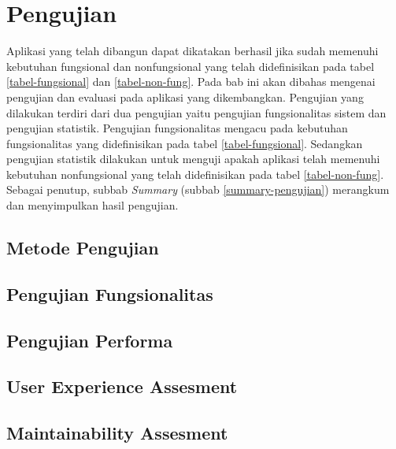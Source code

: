 \section{Pengujian}
	Aplikasi yang telah dibangun dapat dikatakan berhasil jika sudah memenuhi kebutuhan fungsional dan nonfungsional yang telah didefinisikan pada tabel \ref{tabel-fungsional} dan \ref{tabel-non-fung}. Pada bab ini akan dibahas mengenai pengujian dan evaluasi pada aplikasi yang dikembangkan. Pengujian yang dilakukan terdiri dari dua pengujian yaitu pengujian fungsionalitas sistem dan pengujian statistik. Pengujian fungsionalitas mengacu pada kebutuhan fungsionalitas yang didefinisikan pada tabel \ref{tabel-fungsional}. Sedangkan pengujian statistik dilakukan untuk menguji apakah aplikasi telah memenuhi kebutuhan nonfungsional yang telah didefinisikan pada tabel \ref{tabel-non-fung}. Sebagai penutup, subbab \textit{Summary} (subbab \ref{summary-pengujian}) merangkum dan menyimpulkan hasil pengujian.

	
	\subsection{Metode Pengujian}
	
		
	\subsection{Pengujian Fungsionalitas}
	\label{uji-fungsional}
	
	
	\subsection{Pengujian Performa}
	\label{uji-performa}
	
	
	\subsection{User Experience Assesment}
	\label{[uji-ux}
	
	
	\subsection{Maintainability Assesment}
	\label{uji-maintainability}
	
	
	
		
		
